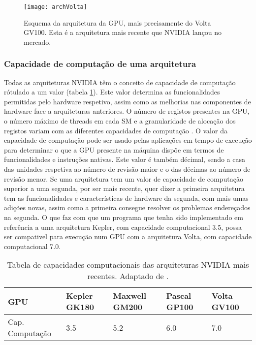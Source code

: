 \begin{itemize}
\end{itemize}
  \begin{figure}[ht]
  \centering
    {\texttt{[image: archVolta]}}
  \caption{Esquema da arquitetura da GPU, mais precisamente do Volta GV100\cite{voltaArch}. Esta é a arquitetura mais recente que NVIDIA lançou no mercado.}
  \label{voltaArch}
\end{figure}
\subsubsection{Capacidade de computação de uma arquitetura}
Todas as arquiteturas NVIDIA têm o conceito de capacidade de computação rótulado a um valor (tabela \ref{tabelaCap}). Este valor determina as funcionalidades permitidas pelo hardware respetivo, assim como as melhorias nas componentes de hardware face a arquiteturas anteriores. O número de registos presentes na GPU, o número máximo de threads em cada SM e a granularidade de alocação dos registos variam com as diferentes capacidades de computação \cite{cudaProgGuide}. O valor da capacidade de computação pode ser usado pelas aplicações em tempo de execução para determinar o que a GPU presente na máquina dispõe em termos de funcionalidades e instruções nativas. Este valor é também décimal, sendo a casa das unidades respetiva ao número de revisão maior e o das décimas ao número de revisão menor. Se uma arquitetura tem um valor de capacidade de computação superior a uma segunda, por ser mais recente, quer dizer a primeira arquitetura tem as funcionalidades e características de hardware da segunda, com mais umas adições novas, assim como a primeira consegue resolver os problemas endereçados na segunda. O que faz com que um programa que tenha sido implementado em referência a uma arquitetura Kepler, com capacidade computacional 3.5, possa ser compativel para execução num GPU com a arquitetura Volta, com capacidade computacional 7.0.
\begin{table}[]
\centering

\begin{tabular}{|l|l|l|l|l|}
\hline
GPU             & Kepler GK180 & Maxwell GM200 & Pascal GP100 & Volta GV100 \\ \hline
Cap. Computação & 3.5          & 5.2           & 6.0          & 7.0         \\ \hline
\end{tabular}
\caption{Tabela de capacidades computacionais das arquiteturas NVIDIA mais recentes. Adaptado de \cite{voltaArch}.}
\label{tabelaCap}
\end{table}
%
%
